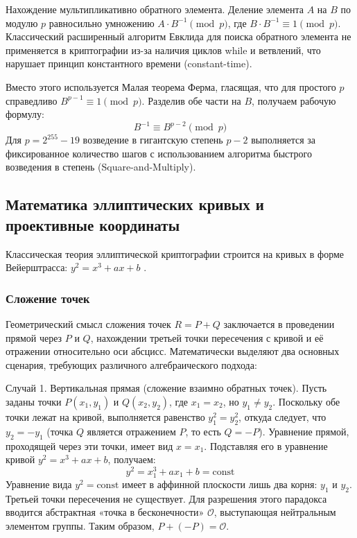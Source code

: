 Нахождение мультипликативно обратного элемента.
Деление элемента $A$ на $B$ по модулю $p$ равносильно умножению $A \cdot B^{-1} \pmod p$, где $B \cdot B^{-1} \equiv 1 \pmod p$. Классический расширенный алгоритм Евклида для поиска обратного элемента не применяется в криптографии из-за наличия циклов while и ветвлений, что нарушает принцип константного времени (constant-time). 

Вместо этого используется Малая теорема Ферма, гласящая, что для простого $p$ справедливо $B^{p-1} \equiv 1 \pmod p$. Разделив обе части на $B$, получаем рабочую формулу:
\begin{equation}
    B^{-1} \equiv B^{p-2} \pmod p
\end{equation}
Для $p = 2^{255}-19$ возведение в гигантскую степень $p-2$ выполняется за фиксированное количество шагов с использованием алгоритма быстрого возведения в степень (Square-and-Multiply).

\subsection{Математика эллиптических кривых и проективные координаты}

Классическая теория эллиптической криптографии строится на кривых в форме Вейерштрасса: $y^2 = x^3 + ax + b$ \cite{Menezes1996}.

\subsubsection{Сложение точек}

Геометрический смысл сложения точек $R = P + Q$ заключается в проведении прямой через $P$ и $Q$, нахождении третьей точки пересечения с кривой и её отражении относительно оси абсцисс. Математически выделяют два основных сценария, требующих различного алгебраического подхода:

Случай 1. Вертикальная прямая (сложение взаимно обратных точек).
Пусть заданы точки $P(x_1, y_1)$ и $Q(x_2, y_2)$, где $x_1 = x_2$, но $y_1 \neq y_2$. Поскольку обе точки лежат на кривой, выполняется равенство $y_1^2 = y_2^2$, откуда следует, что $y_2 = -y_1$ (точка $Q$ является отражением $P$, то есть $Q = -P$).
Уравнение прямой, проходящей через эти точки, имеет вид $x = x_1$. Подставляя его в уравнение кривой $y^2 = x^3 + ax + b$, получаем:
\begin{equation}
    y^2 = x_1^3 + ax_1 + b = \text{const}
\end{equation}
Уравнение вида $y^2 = \text{const}$ имеет в аффинной плоскости лишь два корня: $y_1$ и $y_2$. Третьей точки пересечения не существует. Для разрешения этого парадокса вводится абстрактная «точка в бесконечности» $\mathcal{O}$, выступающая нейтральным элементом группы. Таким образом, $P + (-P) = \mathcal{O}$.

